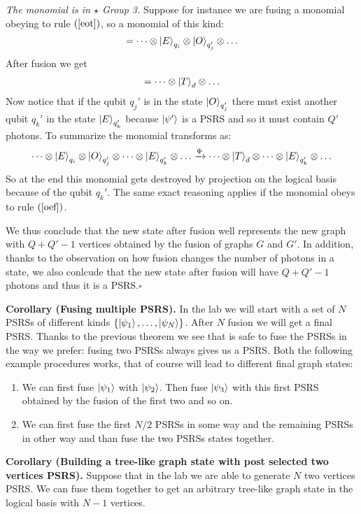 \documentclass{article}
\begin{document}
\textit{The monomial is in $\star$ Group 3.}  Suppose  for instance we are fusing a monomial obeying to rule $(\ref{eot})$, so a monomial of this kind:
\begin{align*}
   [\dots, q^{(i)}_H=0, q^{(i)}_V=0, q'^{(j)}_H=1, q'^{(j)}_V=1, \dots] = \dots \otimes \ket{E}_{q_i} \otimes \ket{O}_{q'_j}\otimes\dots
\end{align*} 
After fusion we get
\begin{align*}
   [\dots, d_H=0, d_H = 1, \dots] = \dots \otimes \ket{T}_d \otimes \dots
\end{align*} 
Now notice that if the qubit $q_j'$ is in the state $\ket{O}_{q_j'}$ there must exist another qubit $q_k'$ in the state $\ket{E}_{q_k'}$ because $\ket{\psi'}$ is a PSRS and so it must contain $Q'$ photons. To summarize the monomial transforms as:
\begin{align*}
    \dots \otimes \ket{E}_{q_i} \otimes \ket{O}_{q'_j}\otimes\dots \otimes \ket{E}_{q'_k} \otimes \dots
    \xrightarrow{\Phi}\dots \otimes \ket{T}_{d}\otimes\dots \otimes \ket{E}_{q'_k} \otimes \dots
\end{align*}
So at the end this monomial gets destroyed by projection on the logical basis because of the qubit $q_k'$.
The same exact reasoning applies if the monomial obeys to rule $(\ref{oef})$.

We thus conclude that the new state after fusion well represents the new graph with $Q+Q'-1$ vertices obtained by the fusion of graphs $G$ and $G'$. In addition, thanks to the observation on how fusion changes the number of photons in a state, we also conlcude that the new state after fusion will have $Q+Q'-1$ photons and thus it is a PSRS.\hfill$\square$

\textbf{Corollary (Fusing multiple PSRS).} In the lab we will start with a set of $N$ PSRSs of different kinds $\{\ket{\psi_1}, \dots, \ket{\psi_N}\}$. After $N$ fusion we will get a final PSRS. Thanks to the previous theorem we see that is safe to fuse the PSRSs in the way we prefer: fusing two PSRSs always gives us a PSRS. Both the following example procedures works, that of course will lead to different final graph states:
\begin{enumerate}
    \item We can first fuse $\ket{\psi_1}$ with $\ket{\psi_2}$. Then fuse $\ket{\psi_3}$ with this first PSRS obtained by the fusion of the first two and so on.
    \item We can first fuse the first $N/2$ PSRSs in some way and the remaining PSRSs in other way and than fuse the two PSRSs states together.
\end{enumerate}

\textbf{Corollary (Building a tree-like graph state with post selected two vertices PSRS).} Suppose that in the lab we are able to generate $N$ two vertices PSRS. We can fuse them together to get an arbitrary tree-like graph state in the logical basis with $N-1$ vertices.
\end{document}

